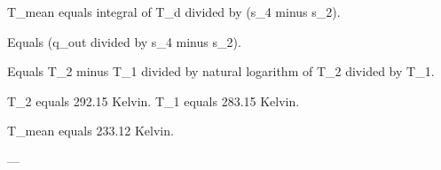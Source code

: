 T_mean equals integral of T_d divided by (s_4 minus s_2).  

Equals (q_out divided by s_4 minus s_2).  

Equals T_2 minus T_1 divided by natural logarithm of T_2 divided by T_1.  

T_2 equals 292.15 Kelvin.  
T_1 equals 283.15 Kelvin.  

T_mean equals 233.12 Kelvin.  

---